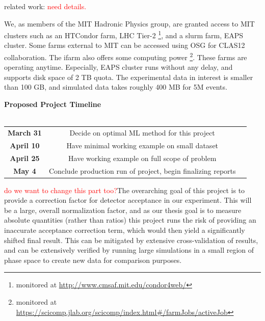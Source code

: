 \documentclass{article}
\begin{document}
related work: \citet{PhysRevD.101.076002}\textcolor{red}{need details.}



\quad We, as members of the MIT Hadronic Physics group, are granted access to MIT clusters such as an HTCondor farm, LHC Tier-2 \footnote{monitored at \url{http://www.cmsaf.mit.edu/condor4web/}}, and a slurm farm, EAPS cluster. Some farms external to MIT can be accessed using OSG for CLAS12 collaboration. The ifarm also offers some computing power \footnote{monitored at \url{https://scicomp.jlab.org/scicomp/index.html\#/farmJobs/activeJob}}. These farms are operating anytime. Especially, EAPS cluster runs without any delay, and supports disk space of 2 TB quota. The experimental data in interest is smaller than 100 GB, and simulated data takes roughly 400 MB for 5M events.


\begin{center}
\textbf{Proposed Project Timeline}\\~\\
\begin{tabular}{ c c c }
  \textbf{March 31} & Decide on optimal ML method for this project \\
  \textbf{April 10} & Have minimal working example on small dataset  \\  
  \textbf{April 25} & Have working example on full scope of problem \\ 
  \textbf{May 4} & Conclude production run of project, begin finalizing reports
\end{tabular}
\end{center}

\quad \textcolor{red}{do we want to change this part too?}The overarching goal of this project is to provide a correction factor for detector acceptance in our experiment. This will be a large, overall normalization factor, and as our thesis goal is to measure absolute quantities (rather than ratios) this project runs the risk of providing an inaccurate acceptance correction term, which would then yield a significantly shifted final result. This can be mitigated by extensive cross-validation of results, and can be extensively verified by running large simulations in a small region of phase space to create new data for comparison purposes.
\end{document}
